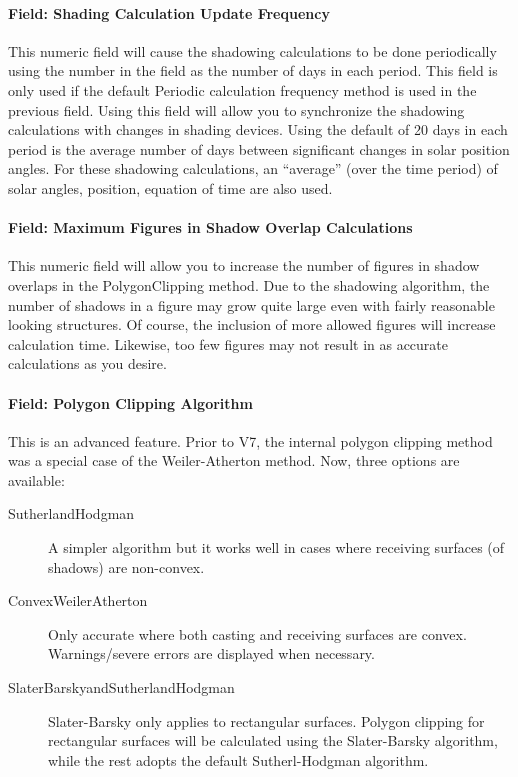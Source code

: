 \paragraph{Field: Shading Calculation Update Frequency}\label{field-calculation-frequency}

This numeric field will cause the shadowing calculations to be done periodically using the number in the field as the number of days in each period. This field is only used if the default Periodic calculation frequency method is used in the previous field. Using this field will allow you to synchronize the shadowing calculations with changes in shading devices. Using the default of 20 days in each period is the average number of days between significant changes in solar position angles. For these shadowing calculations, an ``average'' (over the time period) of solar angles, position, equation of time are also used.

\paragraph{Field: Maximum Figures in Shadow Overlap Calculations}\label{field-maximum-figures-in-shadow-overlap-calculations}

This numeric field will allow you to increase the number of figures in shadow overlaps in the PolygonClipping method. Due to the shadowing algorithm, the number of shadows in a figure may grow quite large even with fairly reasonable looking structures. Of course, the inclusion of more allowed figures will increase calculation time. Likewise, too few figures may not result in as accurate calculations as you desire.

\paragraph{Field: Polygon Clipping Algorithm}\label{field-polygon-clipping-algorithm}

This is an advanced feature. Prior to V7, the internal polygon clipping method was a special case of the Weiler-Atherton method. Now, three options are available:

\begin{description}
    \item[SutherlandHodgman] A simpler algorithm but it works well in cases where receiving surfaces (of shadows) are non-convex.
    \item[ConvexWeilerAtherton] Only accurate where both casting and receiving surfaces are convex. Warnings/severe errors are displayed when necessary.
    \item[SlaterBarskyandSutherlandHodgman] Slater-Barsky only applies to rectangular surfaces. Polygon clipping for rectangular surfaces will be calculated using the Slater-Barsky algorithm, while the rest adopts the default Sutherl-Hodgman algorithm.
\end{description}

